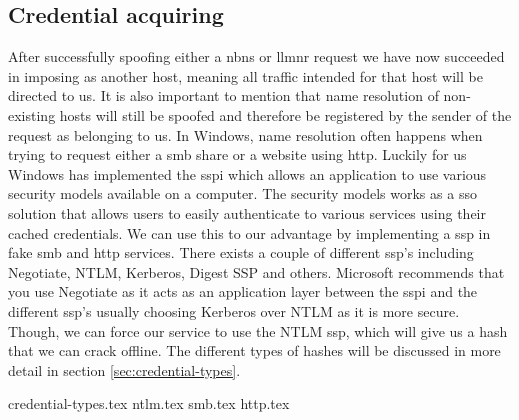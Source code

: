 \documentclass{article}
\begin{document}
\subsection{Credential acquiring}
\label{sec:credential-acquiring}
After successfully spoofing either a \gls{nbns} or \gls{llmnr} request we have now succeeded in imposing as another host, meaning all traffic intended for that host will be directed to us. It is also important to mention that name resolution of non-existing hosts will still be spoofed and therefore be registered by the sender of the request as belonging to us. In Windows, name resolution often happens when trying to request either a \gls{smb} share or a website using \gls{http}. Luckily for us Windows has implemented the \gls{sspi} which allows an application to use various security models available on a computer. The security models works as a \gls{sso} solution that allows users to easily authenticate to various services using their cached credentials\cite{url:microsoft:sspi-model}. We can use this to our advantage by implementing a \gls{ssp} in fake \gls{smb} and \gls{http} services. There exists a couple of different \gls{ssp}'s including Negotiate, NTLM, Kerberos, Digest SSP and others\cite{url:microsoft:ssp-packages}. Microsoft recommends that you use Negotiate as it acts as an application layer between the \gls{sspi} and the different \gls{ssp}'s usually choosing Kerberos over NTLM as it is more secure. Though, we can force our service to use the NTLM \gls{ssp}, which will give us a hash that we can crack offline. The different types of hashes will be discussed in more detail in section \ref{sec:credential-types}. 

{credential-types.tex}
{ntlm.tex}
{smb.tex}
{http.tex}
\end{document}
